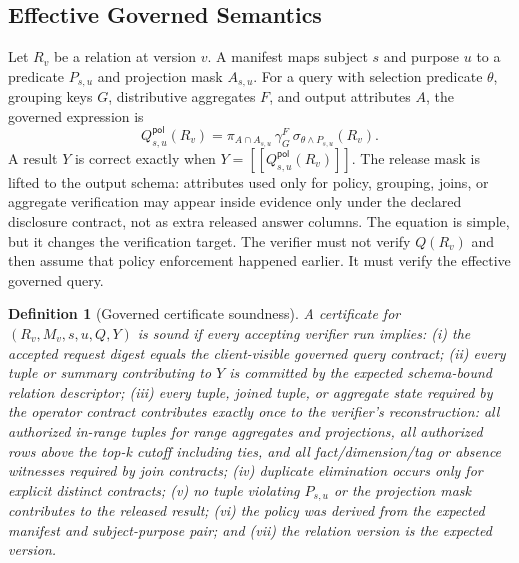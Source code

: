 \documentclass[conference]{IEEEtran}
\newcommand{\qsem}[1]{[\![#1]\!]}
\newcommand{\pol}{\mathsf{pol}}
\newtheorem{definition}{Definition}
\begin{document}
\subsection{Effective Governed Semantics}
Let $R_v$ be a relation at version $v$. A manifest maps subject $s$ and purpose $u$ to a predicate $P_{s,u}$ and projection mask $A_{s,u}$. For a query with selection predicate $\theta$, grouping keys $G$, distributive aggregates $F$, and output attributes $A$, the governed expression is
\begin{equation}
Q^{\pol}_{s,u}(R_v)=\pi_{A\cap A_{s,u}}\,\gamma_G^F\,\sigma_{\theta\wedge P_{s,u}}(R_v).
\end{equation}
A result $Y$ is correct exactly when $Y=\qsem{Q^{\pol}_{s,u}(R_v)}$. The release mask is lifted to the output schema: attributes used only for policy, grouping, joins, or aggregate verification may appear inside evidence only under the declared disclosure contract, not as extra released answer columns. The equation is simple, but it changes the verification target. The verifier must not verify $Q(R_v)$ and then assume that policy enforcement happened earlier. It must verify the effective governed query.

\begin{definition}[Governed certificate soundness]
A certificate for $(R_v,M_v,s,u,Q,Y)$ is sound if every accepting verifier run implies: (i) the accepted request digest equals the client-visible governed query contract; (ii) every tuple or summary contributing to $Y$ is committed by the expected schema-bound relation descriptor; (iii) every tuple, joined tuple, or aggregate state required by the operator contract contributes exactly once to the verifier's reconstruction: all authorized in-range tuples for range aggregates and projections, all authorized rows above the top-k cutoff including ties, and all fact/dimension/tag or absence witnesses required by join contracts; (iv) duplicate elimination occurs only for explicit distinct contracts; (v) no tuple violating $P_{s,u}$ or the projection mask contributes to the released result; (vi) the policy was derived from the expected manifest and subject-purpose pair; and (vii) the relation version is the expected version.
\end{definition}
\end{document}

